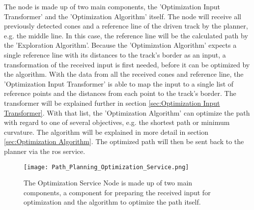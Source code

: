 The node is made up of two main components, the 'Optimization Input Transformer' and the 'Optimization Algorithm' itself. The node will receive all previously detected cones and a reference line of the driven track by the planner, e.g. the middle line. In this case, the reference line will be the calculated path by the 'Exploration Algorithm'. Because the 'Optimization Algorithm' expects a single reference line with its distances to the track's border as an input, a transformation of the received input is first needed, before it can be optimized by the algorithm. With the data from all the received cones and reference line, the 'Optimization Input Transformer' is able to map the input to a single list of reference points and the distances from each point to the track's border. The transformer will be explained further in section \ref{sec:Optimization Input Transformer}. With that list, the 'Optimization Algorithm' can optimize the path with regard to one of several objectives, e.g. the shortest path or minimum curvature. The algorithm will be explained in more detail in section \ref{sec:Optimization Algorithm}. The optimized path will then be sent back to the planner via the  \acrshort{ros} service.
\begin{figure}[H]
    \centering
    \texttt{[image: Path\_Planning\_Optimization\_Service.png]}
    \caption{The Optimization Service Node is made up of two main components, a component for preparing the received input for optimization and the algorithm to optimize the path itself.}
    \label{fig:Path Planning Optimization Service Node}
\end{figure}

